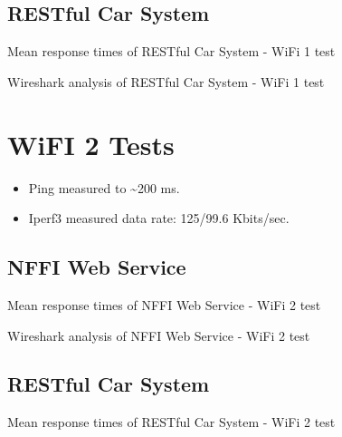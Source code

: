 \begin{appendices}
\subsection{RESTful Car System}

\begin{table}[H]

\caption{Mean response times of RESTful Car System - WiFi 1 test}
\end{table}

\begin{table}[H]

\caption{Wireshark analysis of RESTful Car System - WiFi 1 test}
\end{table}


\section{WiFI 2 Tests}

\begin{itemize}
	\item Ping measured to \textasciitilde 200 ms.
	\item Iperf3 measured data rate: 125/99.6 Kbits/sec.
\end{itemize}

\subsection{NFFI Web Service}

\begin{table}[H]

\caption{Mean response times of NFFI Web Service - WiFi 2 test}
\end{table}

\begin{table}[H]

\caption{Wireshark analysis of NFFI Web Service - WiFi 2 test}
\end{table}

\subsection{RESTful Car System}

\begin{table}[H]

\caption{Mean response times of RESTful Car System - WiFi 2 test}
\end{table}


\end{appendices}
